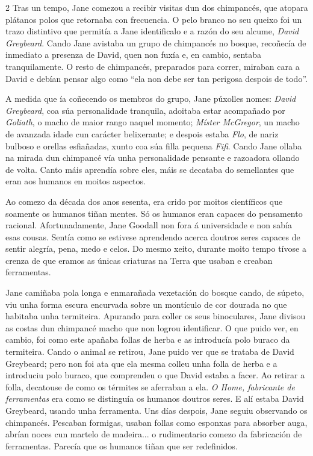 \begin{multicols}{2}
Tras un tempo, Jane comezou a recibir visitas dun dos chimpancés, que atopara
plátanos polos que retornaba con frecuencia. O pelo branco no seu queixo foi un
trazo distintivo que permitía a Jane identificalo e a razón do seu alcume,
\textit{David Greybeard}. Cando Jane avistaba un grupo de chimpancés no bosque,
recoñecía de inmediato a presenza de David, quen non fuxía e, en cambio,
sentaba tranquilamente. O resto de chimpancés, preparados para correr, miraban
cara a David e debían pensar algo como ``ela non debe ser tan perigosa despois
de todo''.

A medida que ía coñecendo os membros do grupo, Jane púxolles nomes:
\textit{David Greybeard}, coa súa personalidade tranquila, adoitaba estar
acompañado por \textit{Goliath}, o macho de maior rango naquel momento;
\textit{Míster McGregor}, un macho de avanzada idade cun carácter belixerante;
e despois estaba \textit{Flo}, de nariz bulboso e orellas esfiañadas, xunto coa
súa filla pequena \textit{Fifi}. Cando Jane ollaba na mirada dun chimpancé vía unha
personalidade pensante e razoadora ollando de volta. Canto máis aprendía sobre
eles, máis se decataba do semellantes que eran aos humanos en moitos
aspectos.

Ao comezo da década dos anos sesenta, era crido por moitos científicos que
soamente os humanos tiñan mentes. Só os humanos eran capaces do pensamento
racional. Afortunadamente, Jane Goodall non fora á universidade e non sabía
esas cousas. Sentía como se estivese aprendendo acerca doutros seres capaces de
sentir alegría, pena, medo e celos. Do mesmo xeito, durante moito tempo tívose
a crenza de que eramos as únicas criaturas na Terra que usaban e creaban
ferramentas.

Jane camiñaba pola longa e enmarañada vexetación do bosque cando, de súpeto,
viu unha forma escura encurvada sobre un montículo de cor dourada no que
habitaba unha termiteira. Apurando para coller os seus binoculares, Jane
divisou as costas dun chimpancé macho que non logrou identificar. O que puido
ver, en cambio, foi como este apañaba follas de herba e as introducía polo
buraco da termiteira. Cando o animal se retirou, Jane puido ver que se trataba
de David Greybeard; pero non foi ata que ela mesma colleu unha folla de herba e
a introduciu polo buraco, que comprendeu o que David estaba a facer. Ao retirar
a folla, decatouse de como os térmites se aferraban a ela. \textit{O Home,
fabricante de ferramentas} era como se distinguía os humanos doutros seres. E
alí estaba David Greybeard, usando unha ferramenta. Uns días despois, Jane
seguiu observando os chimpancés. Pescaban formigas, usaban follas como esponxas
para absorber auga, abrían noces cun martelo de madeira... o rudimentario
comezo da fabricación de ferramentas. Parecía que os humanos tiñan que ser
redefinidos.


\end{multicols}
